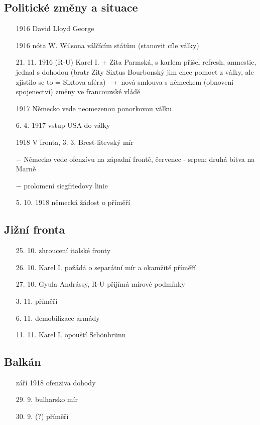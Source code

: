 \documentclass{article}
\begin{document}
\subsection*{Politické změny a situace}
\begin{itemize}
    \vspace{-0.5em}
    \setlength\itemsep{0.15em}
    \item[1916]   David Lloyd George
    \item[1916]  nóta W. Wilsona válčícím státům (stanovit cíle války)
    \item[21. 11. 1916]  (R-U) Karel I. + Zita Parmská, s karlem přišel refresh, amnestie, jednal s dohodou (bratr Zity Sixtus Bourbonský jim chce pomoct z války, ale zjistilo se to = Sixtova aféra) $\rightarrow$  nová smlouva s německem (obnovení spojenectví)
    změny ve francouzské vládě
    \item[1917] Německo vede neomezenou ponorkovou válku
    \item[6. 4. 1917] vstup USA do války
    \item[1918] V fronta, 3. 3. Brest-litevský mír
    \item[$-$] Německo vede ofenzívu na západní frontě,
    červenec - srpen: druhá bitva na Marně
    \item[$-$] prolomení siegfriedovy linie
    \item[5. 10. 1918]  německá žádost o příměří
\end{itemize}

\subsection*{Jižní fronta}
\begin{itemize}
    \vspace{-0.5em}
    \setlength\itemsep{0.15em}
    \item[25. 10.]  zhroucení italské fronty
    \item[26. 10.]  Karel I. požádá o separátní mír a okamžité příměří
    \item[27. 10.]  Gyula Andrássy, R-U přijímá mírové podmínky
    \item[3. 11.]  příměří
    \item[6. 11.]  demobilizace armády
    \item[11. 11.]  Karel I. opouští Schönbrünn
\end{itemize}

\subsection*{Balkán}
\begin{itemize}
    \vspace{-0.5em}
    \setlength\itemsep{0.15em}
    \item[září 1918]  ofenziva dohody
    \item[29. 9.]  bulharsko mír
    \item[30. 9.]  (?) příměří
\end{itemize}
\end{document}
